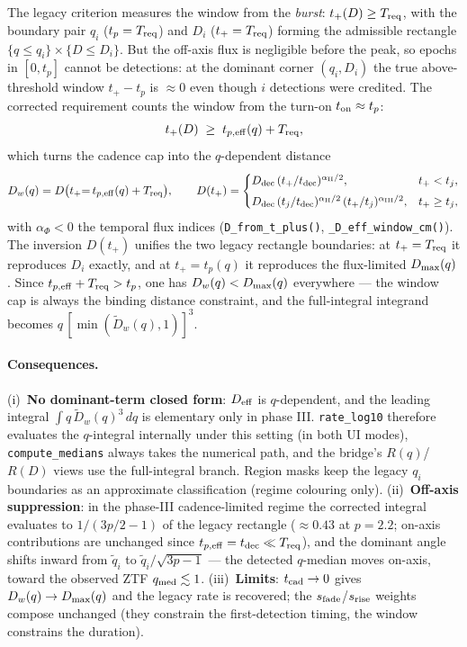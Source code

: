 \documentclass[11pt,a4paper]{article}
\begin{document}
The legacy criterion measures the window from the \emph{burst}: $t_{+}(D)\ge T_{\rm req}$, with the boundary pair $q_i$ ($t_p=T_{\rm req}$) and $D_i$ ($t_+=T_{\rm req}$) forming the admissible rectangle $\{q\le q_i\}\times\{D\le D_i\}$. But the off-axis flux is negligible before the peak, so epochs in $[0,t_p]$ cannot be detections: at the dominant corner $(q_i,D_i)$ the true above-threshold window $t_+-t_p$ is $\approx 0$ even though $i$ detections were credited. The corrected requirement counts the window from the turn-on $t_{\rm on}\approx t_p$:
\begin{equation}
\label{eq:window_from_peak}
t_{+}(D)\;\ge\;t_{p,\rm eff}(q)+T_{\rm req},
\end{equation}
which turns the cadence cap into the $q$-dependent distance
\begin{equation}
\label{eq:D_window}
D_w(q)=D\bigl(t_+{=}\,t_{p,\rm eff}(q)+T_{\rm req}\bigr),\qquad
D(t_+)=
\begin{cases}
D_{\rm dec}\,(t_+/t_{\rm dec})^{\alpha_{\rm II}/2}, & t_+<t_j,\\[4pt]
D_{\rm dec}\,(t_j/t_{\rm dec})^{\alpha_{\rm II}/2}\,(t_+/t_j)^{\alpha_{\rm III}/2}, & t_+\ge t_j,
\end{cases}
\end{equation}
with $\alpha_\Phi<0$ the temporal flux indices (\texttt{D\_from\_t\_plus()}, \texttt{\_D\_eff\_window\_cm()}). The inversion $D(t_+)$ unifies the two legacy rectangle boundaries: at $t_+=T_{\rm req}$ it reproduces $D_i$ exactly, and at $t_+=t_p(q)$ it reproduces the flux-limited $D_{\rm max}(q)$. Since $t_{p,\rm eff}+T_{\rm req}>t_p$, one has $D_w(q)<D_{\rm max}(q)$ everywhere --- the window cap is always the binding distance constraint, and the full-integral integrand becomes $q\,[\min(\tilde D_w(q),1)]^3$.

\paragraph{Consequences.}
(i)~\textbf{No dominant-term closed form}: $D_{\rm eff}$ is $q$-dependent, and the leading integral $\int q\,\tilde D_w(q)^3\,dq$ is elementary only in phase III. \texttt{rate\_log10} therefore evaluates the $q$-integral internally under this setting (in both UI modes), \texttt{compute\_medians} always takes the numerical path, and the bridge's $R(q)$/$R(D)$ views use the full-integral branch. Region masks keep the legacy $q_i$ boundaries as an approximate classification (regime colouring only).
(ii)~\textbf{Off-axis suppression}: in the phase-III cadence-limited regime the corrected integral evaluates to $1/(3p/2-1)$ of the legacy rectangle ($\approx 0.43$ at $p=2.2$; on-axis contributions are unchanged since $t_{p,\rm eff}=t_{\rm dec}\ll T_{\rm req}$), and the dominant angle shifts inward from $\tilde q_i$ to $\tilde q_i/\sqrt{3p-1}$ --- the detected $q$-median moves on-axis, toward the observed ZTF $q_{\rm med}\lesssim 1$.
(iii)~\textbf{Limits}: $t_{\rm cad}\to0$ gives $D_w(q)\to D_{\rm max}(q)$ and the legacy rate is recovered; the $s_{\rm fade}$/$s_{\rm rise}$ weights compose unchanged (they constrain the first-detection timing, the window constrains the duration).
\end{document}
